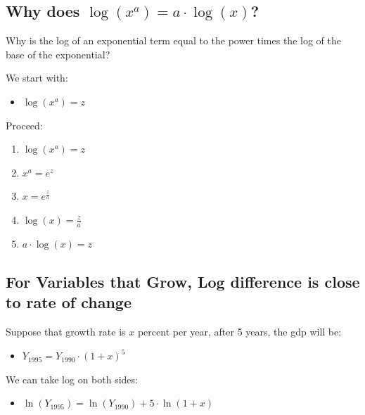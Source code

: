 \documentclass[
]{book}
\providecommand{\tightlist}{%
  \setlength{\itemsep}{0pt}\setlength{\parskip}{0pt}}
\begin{document}
\hypertarget{why-does-log-xa-acdot-log-x}{%
\subsection{\texorpdfstring{Why does \(\log (x^a )=a\cdot \log (x)\)?}{Why does \textbackslash log (x\^{}a )=a\textbackslash cdot \textbackslash log (x)?}}\label{why-does-log-xa-acdot-log-x}}

Why is the log of an exponential term equal to the power times the log
of the base of the exponential?

We start with:

\begin{itemize}
\tightlist
\item
  \(\displaystyle \log (x^a )=z\)
\end{itemize}

Proceed:

\begin{enumerate}
\def\labelenumi{\arabic{enumi}.}
\item
  \(\displaystyle \log (x^a )=z\)
\item
  \(\displaystyle x^a =e^z\)
\item
  \(\displaystyle x=e^{\frac{z}{a}}\)
\item
  \(\displaystyle \log (x)=\frac{z}{a}\)
\item
  \(\displaystyle a\cdot \log (x)=z\)
\end{enumerate}

\hypertarget{for-variables-that-grow-log-difference-is-close-to-rate-of-change}{%
\subsection{For Variables that Grow, Log difference is close to rate of change}\label{for-variables-that-grow-log-difference-is-close-to-rate-of-change}}

Suppose that growth rate is \(x\) percent per year, after 5 years, the gdp
will be:

\begin{itemize}
\tightlist
\item
  \(\displaystyle Y_{1995} =Y_{1990} \cdot (1+x)^5\)
\end{itemize}

We can take log on both sides:

\begin{itemize}
\tightlist
\item
  \(\displaystyle \ln (Y_{1995} )=\ln (Y_{1990} )+5\cdot \ln (1+x)\)
\end{itemize}
\end{document}
